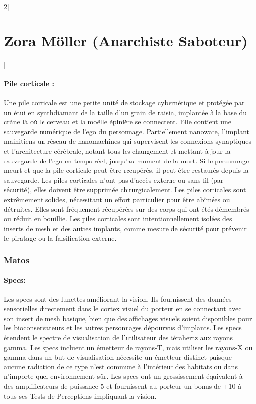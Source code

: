 \documentclass[a4paper,9pt]{article}
\begin{document}
\begin{multicols}{2}[\section*{Zora Möller (Anarchiste Saboteur)}]
\paragraph{Pile corticale :}
Une pile corticale est une petite unité de stockage cybernétique et protégée
par un étui en synthdiamant de la taille d'un grain de raisin, implantée à la
base du crâne là où le cerveau et la moëlle épinière se connectent. Elle
contient une sauvegarde numérique de l'ego du personnage. Partiellement
nanoware, l'implant mainitiens un réseau de nanomachines qui supervisent
les connexions synaptiques et l'architecture cérébrale, notant tous les
changement et mettant à jour la sauvegarde de l'ego en temps réel, jusqu'au
moment de la mort. Si le personnage meurt et que la pile corticale peut être
récupérés, il peut être restaurés depuis la sauvegarde. Les piles corticales
n'ont pas d'accès externe ou sans-fil (par sécurité), elles doivent être
supprimée chirurgicalement. Les piles corticales sont extrêmement solides,
nécessitant un effort particulier pour être abîmées ou détruites. Elles sont
fréquement récupérées sur des corps qui ont étés démembrés ou réduit en
bouillie. Les piles corticales sont intentionnellement isolées des inserts de
mesh et des autres implants, comme mesure de sécurité pour prévenir le piratage
ou la falsification externe.

\subsubsection*{Matos}

\paragraph{Specs:} Les specs sont des lunettes améliorant la vision. Ils
fournissent des données sensorielles directement dans le cortex visuel
du porteur en se connectant avec son insert de mesh basique, bien que
des affichages visuels soient disponibles pour les bioconservateurs et les
autres personnages dépourvus d'implants. Les specs étendent le spectre de
visualisation de l'utilisateur des térahertz aux rayons gamma. Les
specs incluent un émetteur de rayons-T, mais utiliser les rayons-X ou
gamma dans un but de visualisation nécessite un émetteur distinct puisque
aucune radiation de ce type n'est commune à l'intérieur des habitats ou dans
n'importe quel environnement sûr. Les specs ont un grossissement équivalent à
des amplificateurs de puissance 5 et fournissent au porteur un bonus de +10 à
tous ses Tests de Perceptions impliquant la vision.

\end{multicols}
\end{document}
